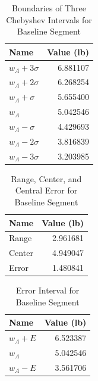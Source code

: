 \begin{table}[ht]
    \centering
    \begin{tabular}{|l|r|}
        \hline
        \textbf{Name} & \textbf{Value (lb)} \\
        \hline
        $w_{A} + 3 \sigma$ & 6.881107 \\
        $w_{A} + 2 \sigma$ & 6.268254 \\
        $w_{A} + \sigma$ & 5.655400 \\
        \hline
        $w_{A}$ & 5.042546 \\
        \hline
        $w_{A} - \sigma$ & 4.429693 \\
        $w_{A} - 2 \sigma$ & 3.816839 \\
        $w_{A} - 3 \sigma$ & 3.203985 \\
        \hline
    \end{tabular}
    \caption{Boundaries of Three Chebyshev Intervals for Baseline Segment}
    \label{table:00.baseline.chebyshev}
\end{table}
\newpage
\begin{table}[ht]
    \centering
	\begin{tabular}{|l|r|} \hline
		\textbf{Name} & \textbf{Value (lb)} \\
		\hline
		Range & 2.961681 \\
	    Center & 4.949047 \\
		Error & 1.480841 \\
		\hline
	\end{tabular}
    \caption{Range, Center, and Central Error for Baseline Segment}
    \label{table:00.baseline.range}
\end{table}
\begin{table}[ht]
    \centering
	\begin{tabular}{|l|r|} \hline
		\textbf{Name} & \textbf{Value (lb)} \\
		\hline
        $w_{A} + E$ & 6.523387 \\
        $w_{A}$ & 5.042546 \\
        $w_{A} - E$ & 3.561706 \\
		\hline
	\end{tabular}
    \caption{Error Interval for Baseline Segment}
    \label{table:00.baseline.interval}
\end{table}
